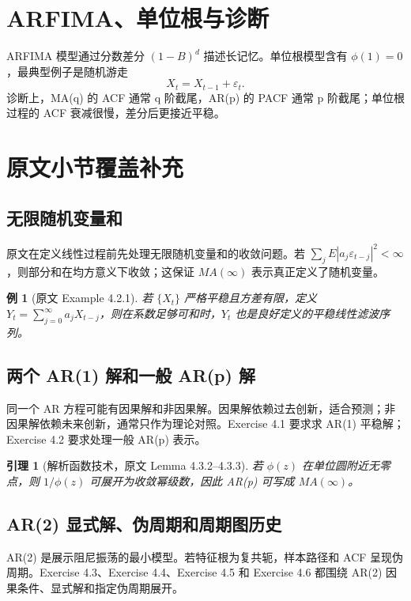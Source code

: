 \documentclass[11pt,a4paper,openany]{ctexbook}
\newtheorem{lemma}{引理}[section]
\newtheorem{example}{例}[section]
\begin{document}
\section{ARFIMA、单位根与诊断}

ARFIMA 模型通过分数差分 \((1-B)^d\) 描述长记忆。单位根模型含有 \(\phi(1)=0\)，最典型例子是随机游走
\[
  X_t=X_{t-1}+\varepsilon_t.
\]
诊断上，MA(q) 的 ACF 通常 q 阶截尾，AR(p) 的 PACF 通常 p 阶截尾；单位根过程的 ACF 衰减很慢，差分后更接近平稳。

\section{原文小节覆盖补充}

\subsection{无限随机变量和}
原文在定义线性过程前先处理无限随机变量和的收敛问题。若 \(\sum_jE|a_j\varepsilon_{t-j}|^2<\infty\)，则部分和在均方意义下收敛；这保证 \(MA(\infty)\) 表示真正定义了随机变量。

\begin{example}[原文 Example 4.2.1]
若 \(\{X_t\}\) 严格平稳且方差有限，定义 \(Y_t=\sum_{j=0}^{\infty}a_jX_{t-j}\)，则在系数足够可和时，\(Y_t\) 也是良好定义的平稳线性滤波序列。
\end{example}

\subsection{两个 AR(1) 解和一般 AR(p) 解}
同一个 AR 方程可能有因果解和非因果解。因果解依赖过去创新，适合预测；非因果解依赖未来创新，通常只作为理论对照。Exercise 4.1 要求求 AR(1) 平稳解；Exercise 4.2 要求处理一般 AR(p) 表示。

\begin{lemma}[解析函数技术，原文 Lemma 4.3.2--4.3.3]
若 \(\phi(z)\) 在单位圆附近无零点，则 \(1/\phi(z)\) 可展开为收敛幂级数，因此 AR(p) 可写成 \(MA(\infty)\)。
\end{lemma}

\subsection{AR(2) 显式解、伪周期和周期图历史}
AR(2) 是展示阻尼振荡的最小模型。若特征根为复共轭，样本路径和 ACF 呈现伪周期。Exercise 4.3、Exercise 4.4、Exercise 4.5 和 Exercise 4.6 都围绕 AR(2) 因果条件、显式解和指定伪周期展开。
\end{document}
